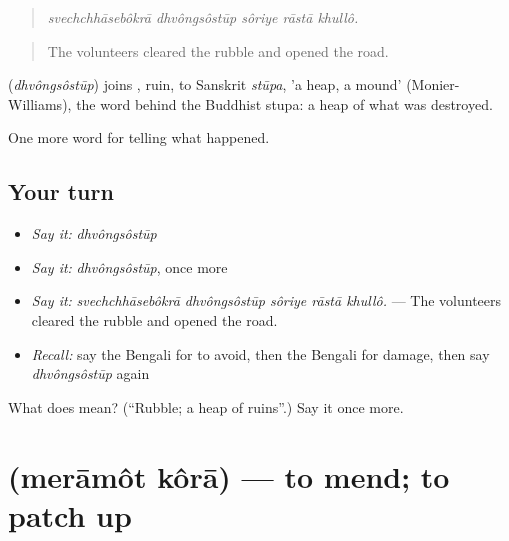 \begin{quote}
\emph{svechchhāsebôkrā dhvôngsôstūp sôriye rāstā khullô.}
\end{quote}

\begin{quote}
The volunteers cleared the rubble and opened the road.
\end{quote}

\begin{cousinweb}
\textbf{} (\emph{dhvôngsôstūp}) joins \textbf{}, ruin, to Sanskrit \emph{stūpa}, 'a heap, a mound' (Monier-Williams), the word behind the Buddhist stupa: a heap of what was destroyed.
\end{cousinweb}

\begin{grammarlens}[title={What you've built}]
One more word for telling what happened.
\end{grammarlens}

\subsection*{Your turn}
\begin{itemize}
\raggedright
  \item \emph{Say it:} \emph{dhvôngsôstūp}
  \item \emph{Say it:} \emph{dhvôngsôstūp}, once more
  \item \emph{Say it:} \emph{svechchhāsebôkrā dhvôngsôstūp sôriye rāstā khullô.} — The volunteers cleared the rubble and opened the road.
  \item \emph{Recall:} say the Bengali for to avoid, then the Bengali for damage, then say \emph{dhvôngsôstūp} again
\end{itemize}

\begin{tcolorbox}[breakable,colback=teal!4,colframe=teal!35!black,title={Before you move on}]
What does  mean? (\textquotedblleft{}Rubble; a heap of ruins\textquotedblright{}.) Say it once more.
\end{tcolorbox}
\section[\texorpdfstring{\bn{মেরামত} \bn{করা} (merāmôt kôrā)}{মেরামত করা (merāmôt kôrā)}]{  (merāmôt kôrā) — to mend; to patch up}

\label{lesson:BN-C295-meramot-kora}



